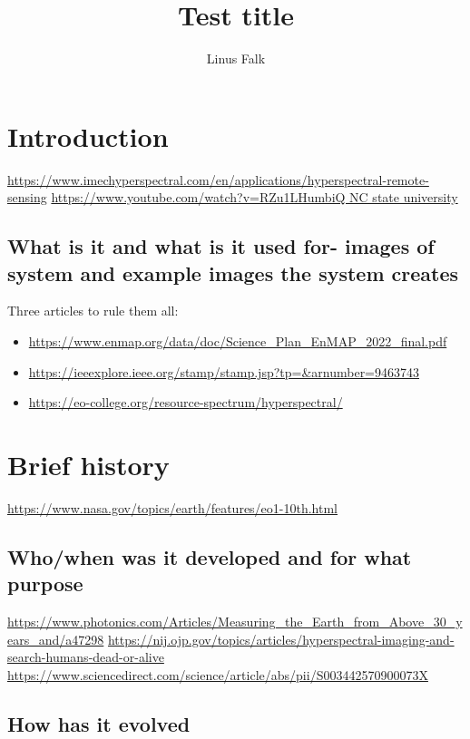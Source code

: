 \documentclass[a4paper]{article}
\title{Test title}
\author{Linus Falk}
\begin{document}
\maketitle

\section{Introduction}
\url{https://www.imechyperspectral.com/en/applications/hyperspectral-remote-sensing}
\url{https://www.youtube.com/watch?v=RZu1LHumbiQ NC state university}

    \subsection*{What is it and what is it used for- images of system and example 
    images the system creates
    }

    Three articles to rule them all: 
    \begin{itemize}
        \item \url{https://www.enmap.org/data/doc/Science_Plan_EnMAP_2022_final.pdf}
        \item \url{https://ieeexplore.ieee.org/stamp/stamp.jsp?tp=&arnumber=9463743}
        \item \url{https://eo-college.org/resource-spectrum/hyperspectral/}
    \end{itemize}


\section{Brief history}
\url{https://www.nasa.gov/topics/earth/features/eo1-10th.html}



    \subsection*{Who/when was it developed and for what purpose}
    \url{https://www.photonics.com/Articles/Measuring_the_Earth_from_Above_30_years_and/a47298}
    \url{https://nij.ojp.gov/topics/articles/hyperspectral-imaging-and-search-humans-dead-or-alive}
    \url{https://www.sciencedirect.com/science/article/abs/pii/S003442570900073X}

    \subsection*{How has it evolved}
\end{document}
